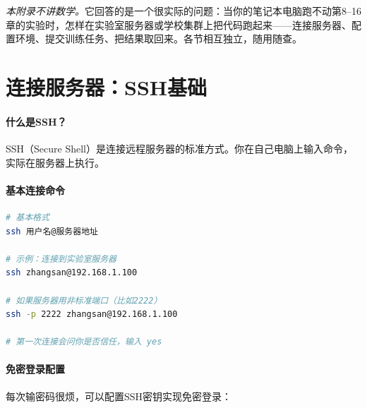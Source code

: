 

\noindent\textit{本附录不讲数学。}它回答的是一个很实际的问题：当你的笔记本电脑跑不动第8--16章的实验时，怎样在实验室服务器或学校集群上把代码跑起来——连接服务器、配置环境、提交训练任务、把结果取回来。各节相互独立，随用随查。

\section*{连接服务器：SSH基础}

\paragraph{什么是SSH？}

SSH（Secure Shell）是连接远程服务器的标准方式。你在自己电脑上输入命令，实际在服务器上执行。

\paragraph{基本连接命令}\mbox{}\par\nopagebreak

\begin{lstlisting}[language=bash, caption=SSH连接服务器]
# 基本格式
ssh 用户名@服务器地址

# 示例：连接到实验室服务器
ssh zhangsan@192.168.1.100

# 如果服务器用非标准端口（比如2222）
ssh -p 2222 zhangsan@192.168.1.100

# 第一次连接会问你是否信任，输入 yes
\end{lstlisting}

\paragraph{免密登录配置}

每次输密码很烦，可以配置SSH密钥实现免密登录：

